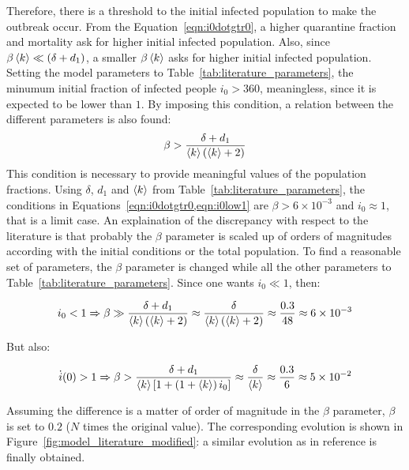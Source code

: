 Therefore, there is a threshold to the initial infected population to make the outbreak occur. From the Equation~\ref{eqn:i0dotgtr0}, a higher quarantine fraction and mortality ask for higher initial infected population. Also, since $\beta\braket{k}\ll\left(\delta+d_1\right)$, a smaller $\beta\braket{k}$ asks for higher initial infected population. Setting the model parameters to Table~\ref{tab:literature_parameters}, the minumum initial fraction of infected people $i_0>360$, meaningless, since it is expected to be lower than $1$. By imposing this condition, a relation between the different parameters is also found: 
\begin{equation}
\beta > \frac{\delta + d_1}{\braket{k}(\braket{k}+2)}
\label{eqn:i0low1}
\end{equation}
This condition is necessary to provide meaningful values of the population fractions. Using $\delta$, $d_1$ and $\braket{k}$ from Table~\ref{tab:literature_parameters}, the conditions in Equations~\ref{eqn:i0dotgtr0,eqn:i0low1} are $\beta>6\times10^{-3}$ and $i_0\approx1$, that is a limit case. An explaination of the discrepancy with respect to the literature is that probably the $\beta$ parameter is scaled up of orders of magnitudes according with the initial conditions or the total population. To find a reasonable set of parameters, the $\beta$ parameter is changed while all the other parameters to Table~\ref{tab:literature_parameters}. Since one wants $i_0\ll1$, then:

\begin{equation}
i_0<1 \Rightarrow \beta\gg \frac{\delta + d_1}{\braket{k}(\braket{k}+2)} \approx \frac{\delta}{\braket{k}(\braket{k}+2)} \approx \frac{0.3}{48} \approx 6\times10^{-3}
\label{eqn:numerical_i0low1}
\end{equation}

But also: 

\begin{equation}
\dot{i}(0)>1 \Rightarrow \beta > \frac{\delta + d_1}{\braket{k}\left[1+\left(1+\braket{k}\right)i_0\right]} \approx \frac{\delta}{\braket{k}} \approx \frac{0.3}{6} \approx 5\times10^{-2}
\label{eqn:numerical_i0dotgtr1}
\end{equation}

Assuming the difference is a matter of order of magnitude in the $\beta$ parameter, $\beta$ is set to $0.2$ ($N$ times the original value). The corresponding evolution is shown in Figure~\ref{fig:model_literature_modified}: a similar evolution as in reference  \cite{MingLiu} is finally obtained.

